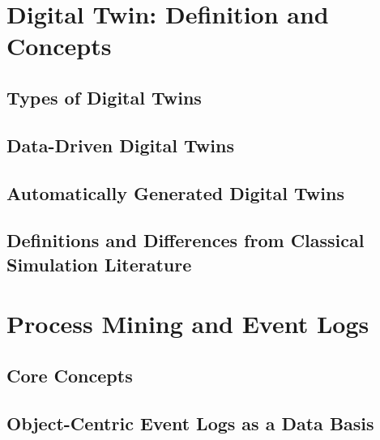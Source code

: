 
\section{Digital Twin: Definition and Concepts}
\label{sec:digital-twin}
\subsection{Types of Digital Twins}

\subsection{Data-Driven Digital Twins}

\subsection{Automatically Generated Digital Twins}
\subsection{Definitions and Differences from Classical Simulation Literature}

\section{Process Mining and Event Logs}
\label{sec:process-mining}

\subsection{Core Concepts}

\subsection{Object-Centric Event Logs as a Data Basis}
\label{sec:object-centric-event-logs}



